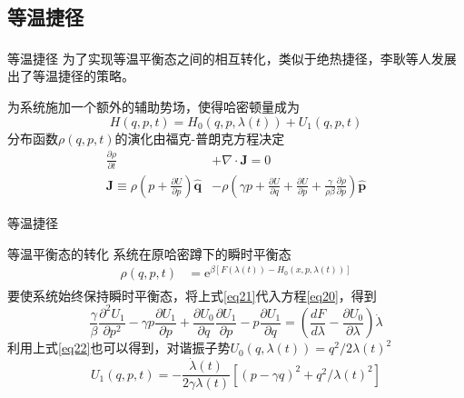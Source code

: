 \documentclass{beamer}
\newcommand{\upcite}[1]{\textsuperscript{\cite{#1}}}  %
\newcommand{\PP}[2]{\frac{\partial #1}{\partial #2}}
\begin{document}
\subsection{等温捷径}
\begin{frame}{等温捷径}
为了实现等温平衡态之间的相互转化，类似于绝热捷径，李耿等人\upcite{Li2016}发展出了等温捷径的策略。

\pause

为系统施加一个额外的辅助势场，使得哈密顿量成为
\begin{equation}
    H(q, p, t)=H_{0}(q, p, \lambda(t))+U_{1}(q, p, t)
    \label{eq19}
\end{equation}
\pause
分布函数$\rho(q, p, t)$的演化由福克-普朗克方程决定
\begin{equation}
    \begin{split}
        \PP{\rho}{t} &+ \nabla \cdot \bm{J} = 0\\
        \bm{J} \equiv \rho \left( p + \PP{U}{p} \right) \hat{\mathbf{q}}&-\rho\left(\gamma p+\frac{\partial U}{\partial q}+ \PP{U}{p} + \frac{\gamma}{\rho \beta} \frac{\partial \rho}{\partial p}\right) \hat{\mathbf{p}}
    \end{split}
    \label{eq20}
\end{equation}
\end{frame}

\begin{frame}{等温捷径}
\begin{alertblock}{等温平衡态的转化}
系统在原哈密蹲下的瞬时平衡态
\begin{equation}
    \begin{split}
        \rho(q, p, t) &= \mathrm{e}^{\beta\left[F(\lambda(t))-H_{0}(x, p, \lambda(t))\right]}
    \end{split}
    \label{eq21}
\end{equation}
\pause
要使系统始终保持瞬时平衡态，将上式\eqref{eq21}代入方程\eqref{eq20}，得到\upcite{Li2016}
\begin{equation}
    \frac{\gamma}{\beta} \frac{\partial^{2} U_{1}}{\partial p^{2}}-\gamma p \frac{\partial U_{1}}{\partial p}+\frac{\partial U_{0}}{\partial q} \frac{\partial U_{1}}{\partial p}-p \frac{\partial U_{1}}{\partial q}=\left(\frac{d F}{d \lambda}-\frac{\partial U_{0}}{\partial \lambda}\right) \dot{\lambda}
    \label{eq22}
\end{equation}
\pause
利用上式\eqref{eq22}也可以得到，对谐振子势$U_0 (q, \lambda(t))= q^{2} / 2 \lambda(t)^2$
\begin{equation}
    U_{1}(q, p, t)=-\frac{\dot{\lambda}(t)}{2 \gamma \lambda(t)}\left[(p-\gamma q)^{2}+ q^{2}/\lambda(t)^2\right]
    \label{eq2.62}
\end{equation}
\end{alertblock}
\end{frame} 
\end{document}
